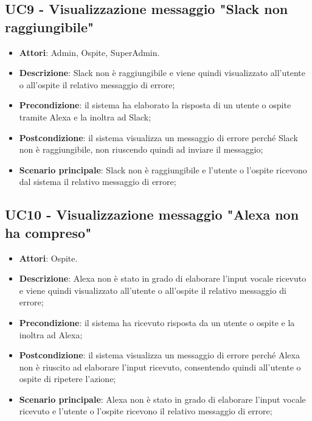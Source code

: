 \documentclass[../AnalisiDeiRequisiti_v3.0.0.tex]{subfiles}
\begin{document}
\subsection{UC9 - Visualizzazione messaggio "Slack non raggiungibile"} 
\label{sssec:UC9} 
\begin{itemize} 
\item \textbf{Attori}: Admin, Ospite, SuperAdmin.
\item \textbf{Descrizione}: Slack non è raggiungibile e viene quindi visualizzato all'utente o all'ospite il relativo messaggio di errore;
\item \textbf{Precondizione}: il sistema ha elaborato la risposta di un utente o ospite tramite Alexa e la inoltra ad Slack;
\item \textbf{Postcondizione}: il sistema visualizza un messaggio di errore perché Slack non è raggiungibile, non riuscendo quindi ad inviare il messaggio;
\item \textbf{Scenario principale}: Slack non è raggiungibile e l'utente o l'ospite ricevono dal sistema il relativo messaggio di errore;
\end{itemize} 
\subsection{UC10 - Visualizzazione messaggio "Alexa non ha compreso"} 
\label{sssec:UC10} 
\begin{itemize} 
\item \textbf{Attori}: Ospite.
\item \textbf{Descrizione}: Alexa non è stato in grado di elaborare l'input vocale ricevuto e viene quindi visualizzato all'utente o all'ospite il relativo messaggio di errore;
\item \textbf{Precondizione}: il sistema ha ricevuto risposta da un utente o ospite e la inoltra ad Alexa;
\item \textbf{Postcondizione}: il sistema visualizza un messaggio di errore perché Alexa non è riuscito ad elaborare l'input ricevuto, consentendo quindi all'utente o ospite di ripetere l'azione;
\item \textbf{Scenario principale}: Alexa non è stato in grado di elaborare l'input vocale ricevuto e l'utente o l'ospite ricevono il relativo messaggio di errore;
\end{itemize} 
\end{document}
